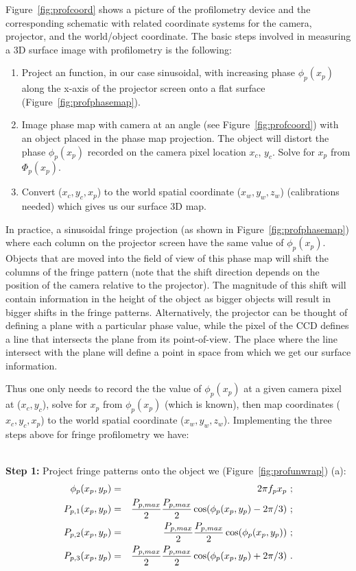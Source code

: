 Figure~\ref{fig:profcoord} shows a picture of the profilometry device and the corresponding schematic with related coordinate systems for the camera, projector, and the world/object coordinate. The basic steps involved in measuring a 3D surface image with profilometry is the following:
\begin{enumerate}[noitemsep]
\item Project an function, in our case sinusoidal, with increasing phase $\phi_p(x_p)$ along the x-axis of the projector screen onto a flat surface (Figure~\ref{fig:profphasemap}).
\item Image phase map with camera at an angle (see Figure~\ref{fig:profcoord}) with an object placed in the phase map projection. The object will distort the phase $\phi_p(x_p)$ recorded on the camera pixel location $x_c$, $y_c$. Solve for $x_p$ from $\Phi_p(x_p)$.
\item Convert ($x_c, y_c, x_p$) to the world spatial coordinate ($x_w,y_w,z_w$) (calibrations needed) which gives us our surface 3D map.
\end{enumerate}

In practice, a sinusoidal fringe projection (as shown in Figure~\ref{fig:profphasemap}) where each column on the projector screen have the same value of $\phi_p(x_p)$. Objects that are moved into the field of view of this phase map will shift the columns of the fringe pattern (note that the shift direction depends on the position of the camera relative to the projector). The magnitude of this shift will contain information in the height of the object as bigger objects will result in bigger shifts in the fringe patterns. Alternatively, the projector can be thought of defining a plane with a particular phase value, while the pixel of the CCD defines a line that intersects the plane from its point-of-view. The place where the line intersect with the plane will define a point in space from which we get our surface information.

Thus one only needs to record the the value of $\phi_p(x_p)$ at a given camera pixel at ($x_c,y_c$), solve for $x_p$ from $\phi_p(x_p)$ (which is known), then map coordinates ($x_c, y_c, x_p$) to the world spatial coordinate ($x_w,y_w,z_w$). Implementing the three steps above for fringe profilometry we have:

\\
\noindent
\textbf{Step 1:} Project fringe patterns onto the object we (Figure~\ref{fig:profunwrap}) (a):
\begin{eqnarray}
\label{eqn:projfringe}
\phi_p(x_p,y_p)& = & 2\pi f_p x_p \label{eqn:x_p} \ ; \\
P_{p,1}(x_p,y_p) & = & \frac{P_{p,max}}{2} \frac{P_{p,max}}{2}\cos(\phi_p(x_p,y_p)-2\pi/3)\notag \ ; \\
P_{p,2}(x_p,y_p) & = & \frac{P_{p,max}}{2} \frac{P_{p,max}}{2}\cos(\phi_p(x_p,y_p))\notag \ ; \\
P_{p,3}(x_p,y_p) & = & \frac{P_{p,max}}{2} \frac{P_{p,max}}{2}\cos(\phi_p(x_p,y_p)+2\pi/3) \ .
\end{eqnarray}

